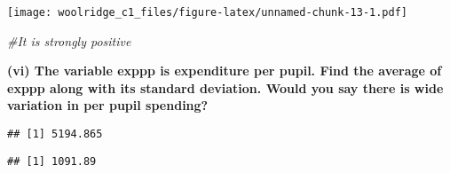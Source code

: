 \documentclass[
]{article}
\newenvironment{Shaded}{\begin{snugshade}}{\end{snugshade}}
\newcommand{\CommentTok}[1]{\textcolor[rgb]{0.56,0.35,0.01}{\textit{#1}}}
\newcommand{\DataTypeTok}[1]{\textcolor[rgb]{0.13,0.29,0.53}{#1}}
\newcommand{\KeywordTok}[1]{\textcolor[rgb]{0.13,0.29,0.53}{\textbf{#1}}}
\newcommand{\NormalTok}[1]{#1}
\newcommand{\OperatorTok}[1]{\textcolor[rgb]{0.81,0.36,0.00}{\textbf{#1}}}
\newcommand{\StringTok}[1]{\textcolor[rgb]{0.31,0.60,0.02}{#1}}
\begin{document}
\begin{Shaded}
\end{Shaded}

\texttt{[image: woolridge\_c1\_files/figure-latex/unnamed-chunk-13-1.pdf]}

\begin{Shaded}
\begin{Highlighting}[]
\CommentTok{#It is strongly positive}
\end{Highlighting}
\end{Shaded}

\textbf{(vi) The variable exppp is expenditure per pupil. Find the
average of exppp along with its standard deviation. Would you say there
is wide variation in per pupil spending? }

\begin{Shaded}
\end{Shaded}

\begin{verbatim}
## [1] 5194.865
\end{verbatim}

\begin{Shaded}
\end{Shaded}

\begin{verbatim}
## [1] 1091.89
\end{verbatim}

\begin{Shaded}
\end{Shaded}
\end{document}
